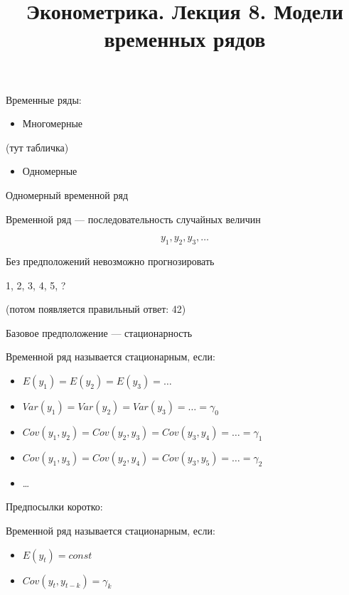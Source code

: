 \documentclass[ignorenonframetext,]{beamer}
\title{Эконометрика. Лекция 8. Модели временных рядов}
\begin{document}
\frame{\titlepage}

\begin{frame}{Временные ряды:}

\begin{itemize}
\itemsep1pt\parskip0pt
\item
  Многомерные
\end{itemize}

(тут табличка)

\begin{itemize}
\itemsep1pt\parskip0pt
\item
  Одномерные
\end{itemize}

\end{frame}

\begin{frame}{Одномерный временной ряд}

Временной ряд --- последовательность случайных величин

\[
y_1, y_2, y_3, \ldots
\]

\end{frame}

\begin{frame}{Без предположений невозможно прогнозировать}

1, 2, 3, 4, 5, ?

(потом появляется правильный ответ: 42)

\end{frame}

\begin{frame}{Базовое предположение --- стационарность}

Временной ряд называется стационарным, если:

\begin{itemize}
\itemsep1pt\parskip0pt
\item
  $E(y_1)=E(y_2)=E(y_3)=\ldots$
\item
  $Var(y_1)=Var(y_2)=Var(y_3)=\ldots=\gamma_0$
\item
  $Cov(y_1,y_2)=Cov(y_2,y_3)=Cov(y_3,y_4)=\ldots=\gamma_1$
\item
  $Cov(y_1,y_3)=Cov(y_2,y_4)=Cov(y_3,y_5)=\ldots=\gamma_2$
\item
  \ldots
\end{itemize}

\end{frame}

\begin{frame}{Предпосылки коротко:}

Временной ряд называется стационарным, если:

\begin{itemize}
\itemsep1pt\parskip0pt
\item
  $E(y_t)=const$
\item
  $Cov(y_t,y_{t-k})=\gamma_k$
\end{itemize}

\end{frame}
\end{document}
